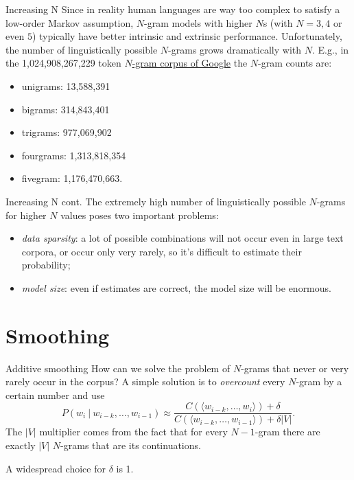 \documentclass[style=upen, size=14pt]{powerdot}
\theoremstyle{definition}
\begin{document}
\begin{slide}[toc=Increasing N]{Increasing N}
  Since in reality human languages are way too complex to satisfy a low-order
  Markov assumption, $N$-gram models with higher $N$s (with $N=3,4$ or even $5$)
  typically have better intrinsic and extrinsic performance.
  Unfortunately, the number of linguistically possible $N$-grams grows
  dramatically with $N$. E.g., in the 1,024,908,267,229 token
  \href{https://catalog.ldc.upenn.edu/LDC2006T13}{$N$-gram corpus of Google} the
  $N$-gram counts are:
  \begin{itemize}
  \item unigrams: 13,588,391
  \item bigrams: 314,843,401
  \item trigrams: 977,069,902
  \item fourgrams: 1,313,818,354
  \item fivegram: 1,176,470,663.
  \end{itemize}
\end{slide}

\begin{slide}[toc=]{Increasing N cont.}
  The extremely high number of linguistically possible $N$-grams for higher $N$
  values poses two important problems:
  \begin{itemize}
  \item \emph{data sparsity}: a lot of possible combinations will not occur even
    in large text corpora, or occur only very rarely, so it's difficult to
    estimate their probability;
  \item \emph{model size}: even if estimates are correct, the model size will be
    enormous.
  \end{itemize}
\end{slide}

\section{Smoothing}

\begin{slide}[toc=Additive smoothing]{Additive smoothing}
  How can we solve the problem of $N$-grams that never or very rarely occur in
  the corpus? A simple solution is to \emph{overcount} every $N$-gram by a certain
  number and use
    $$
    P(w_{i} ~\vert~ w_{i-k},\dots,w_{i-1}) \approx \frac{C(\langle
      w_{i-k},\dots,w_{i}\rangle)+\delta}{C(\langle w_{i-k},\dots,w_{i-1}
      \rangle) + \delta|V|}.
    $$
  The $|V|$ multiplier comes from the fact that for every $N-1$-gram there are
  exactly $|V|$ $N$-grams that are its continuations.\bigskip

  A widespread choice for $\delta$ is 1.
\end{slide}
\end{document}
